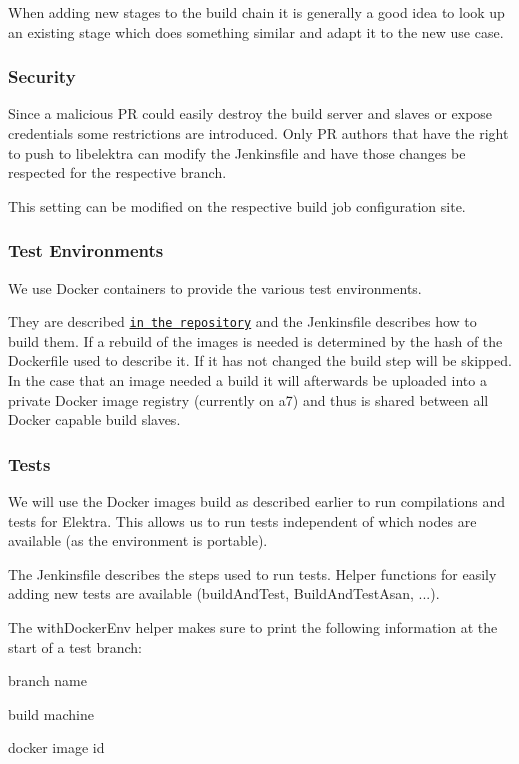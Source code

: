 When adding new stages to the build chain it is generally a good idea to look up an existing stage which does something similar and adapt it to the new use case.

\subsubsection*{Security}

Since a malicious PR could easily destroy the build server and slaves or expose credentials some restrictions are introduced. Only PR authors that have the right to push to libelektra can modify the Jenkinsfile and have those changes be respected for the respective branch.

This setting can be modified on the respective build job configuration site.

\subsubsection*{Test Environments}

We use Docker containers to provide the various test environments.

They are described \href{https://master.libelektra.org/scripts/docker}{\tt in the repository} and the Jenkinsfile describes how to build them. If a rebuild of the images is needed is determined by the hash of the Dockerfile used to describe it. If it has not changed the build step will be skipped. In the case that an image needed a build it will afterwards be uploaded into a private Docker image registry (currently on a7) and thus is shared between all Docker capable build slaves.

\subsubsection*{Tests}

We will use the Docker images build as described earlier to run compilations and tests for Elektra. This allows us to run tests independent of which nodes are available (as the environment is portable).

The Jenkinsfile describes the steps used to run tests. Helper functions for easily adding new tests are available (build\+And\+Test, Build\+And\+Test\+Asan, ...).

The {\ttfamily with\+Docker\+Env} helper makes sure to print the following information at the start of a test branch\+:
\begin{DoxyItemize}
\item branch name
\item build machine
\item docker image id
\end{DoxyItemize}

